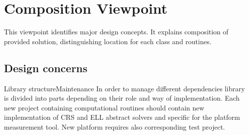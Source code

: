 \chapter{Composition Viewpoint} \label{chp:composition-viewpoint-template}
	\begin{comment}
		The Composition viewpoint describes the way the design subject is (recursively) structured into constituent
		parts and establishes the roles of those parts.
	\end{comment}
	This viewpoint identifies major design concepts. It explains composition of provided solution, distinguishing location for each class and routines.
	\section{Design concerns} \label{s:composition-viewpoint-template:design-concerns}
		\begin{comment}
			Software developers and maintainers use this viewpoint to identify the major design constituents of the
			design subject, to localize and allocate functionality, responsibilities, or other design roles to these
			constituents. In maintenance, it can be used to conduct impact analysis and localize the efforts of making
			changes. Reuse, on the level of existing subsystems and large-grained components, can be addressed as
			well. The information in a Composition view can be used by acquisition management and in project
			management for specification and assignment of work packages, and for planning, monitoring, and control
			of a software project. This information, together with other project information, can be used in estimating
			cost, staffing, and schedule for the development effort. Configuration management may use the information
			to establish the organization, tracking, and change management of emerging work products (see
			IEEE Std 12207-2008 [B21]).
		\end{comment}
		
		\begin{concerns}{Library structure}{Maintenance}
			In order to manage different dependencies library is divided into parts depending on their role and way of implementation. Each new project containing computational routines should contain new implementation of \gls{CRS} and \gls{ELL} abstract solvers and specific for the platform measurement tool. New platform requires also corresponding test project.
		\end{concerns}
